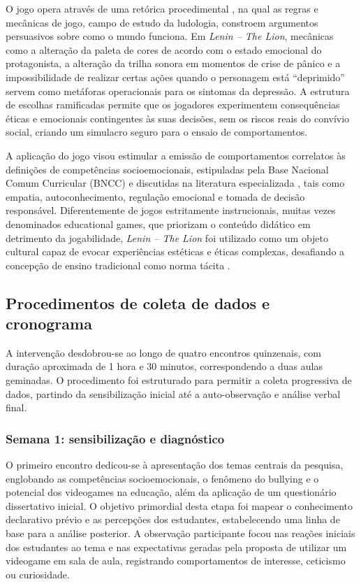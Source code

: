 \documentclass[portuguese]{textolivre}
\begin{document}
O jogo opera através de uma retórica procedimental \cite{bogost2011how}, na qual as regras e mecânicas de jogo, campo de estudo da ludologia, constroem argumentos persuasivos sobre como o mundo funciona. Em \textit{Lenin – The Lion}, mecânicas como a alteração da paleta de cores de acordo com o estado emocional do protagonista, a alteração da trilha sonora em momentos de crise de pânico e a impossibilidade de realizar certas ações quando o personagem está “deprimido” servem como metáforas operacionais para os sintomas da depressão. A estrutura de escolhas ramificadas permite que os jogadores experimentem consequências éticas e emocionais contingentes às suas decisões, sem os riscos reais do convívio social, criando um simulacro seguro para o ensaio de comportamentos.

A aplicação do jogo visou estimular a emissão de comportamentos correlatos às definições de competências socioemocionais, estipuladas pela Base Nacional Comum Curricular (BNCC) \cite{brasil2018bncc} e discutidas na literatura especializada \cite{durlak2011impact}, tais como empatia, autoconhecimento, regulação emocional e tomada de decisão responsável. Diferentemente de jogos estritamente instrucionais, muitas vezes denominados educational games, que priorizam o conteúdo didático em detrimento da jogabilidade, \textit{Lenin – The Lion} foi utilizado como um objeto cultural capaz de evocar experiências estéticas e éticas complexas, desafiando a concepção de ensino tradicional como norma tácita \cite{jenkins2006convergence}.

\subsection{Procedimentos de coleta de dados e cronograma}

A intervenção desdobrou-se ao longo de quatro encontros quinzenais, com duração aproximada de 1 hora e 30 minutos, correspondendo a duas aulas geminadas. O procedimento foi estruturado para permitir a coleta progressiva de dados, partindo da sensibilização inicial até a auto-observação e análise verbal final.

\subsubsection{Semana 1: sensibilização e diagnóstico}

O primeiro encontro dedicou-se à apresentação dos temas centrais da pesquisa, englobando as competências socioemocionais, o fenômeno do bullying e o potencial dos videogames na educação, além da aplicação de um questionário dissertativo inicial. O objetivo primordial desta etapa foi mapear o conhecimento declarativo prévio e as percepções dos estudantes, estabelecendo uma linha de base para a análise posterior. A observação participante focou nas reações iniciais dos estudantes ao tema e nas expectativas geradas pela proposta de utilizar um videogame em sala de aula, registrando comportamentos de interesse, ceticismo ou curiosidade.
\end{document}
